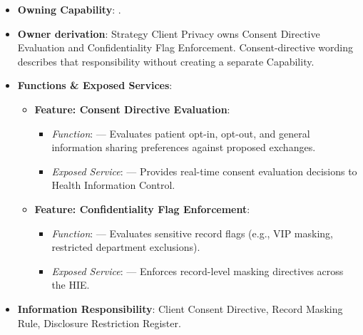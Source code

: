 \begin{itemize}

\item 
\textbf{Owning Capability}: \texttt{}.



\item 
\textbf{Owner derivation}: Strategy Client Privacy owns Consent Directive Evaluation and Confidentiality Flag Enforcement. Consent-directive wording describes that responsibility without creating a separate Capability.



\item 
\textbf{Functions \& Exposed Services}:


\begin{itemize}

\item 
\textbf{Feature: Consent Directive Evaluation}:


\begin{itemize}

\item 
\emph{Function}: \texttt{} — Evaluates patient opt-in, opt-out, and general information sharing preferences against proposed exchanges.



\item 
\emph{Exposed Service}: \texttt{} — Provides real-time consent evaluation decisions to Health Information Control.



\end{itemize}


\item 
\textbf{Feature: Confidentiality Flag Enforcement}:


\begin{itemize}

\item 
\emph{Function}: \texttt{} — Evaluates sensitive record flags (e.g., VIP masking, restricted department exclusions).



\item 
\emph{Exposed Service}: \texttt{} — Enforces record-level masking directives across the HIE.



\end{itemize}


\end{itemize}


\item 
\textbf{Information Responsibility}: Client Consent Directive, Record Masking Rule, Disclosure Restriction Register.



\end{itemize}
\label{rad:em:80}

